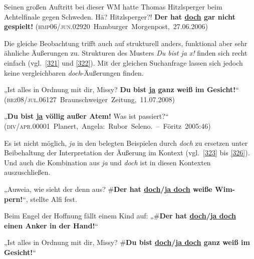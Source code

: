 \begin{exe}
	\ex\label{320}
 
	Seinen großen Auftritt bei dieser WM hatte Thomas Hitzlsperger beim Achtelfinale gegen Schweden. Hä? Hitzlsperger?! \textbf{Der hat \underline{doch} 		gar nicht gespielt!}     
	\hbox{}\hfill\hbox{(\textsc{hmp06/jun.02920} Hamburger Morgenpost, 27.06.2006)}	
\end{exe}						   
Die gleiche Beobachtung trifft auch auf strukturell anders, funktional aber sehr ähnliche Äußerungen zu. Strukturen des Musters \textit{Du bist ja x!} finden sich recht einfach (vgl.\ \ref{321} und \ref{322}). Mit der gleichen Suchanfrage lassen sich jedoch keine vergleichbaren \textit{doch}-Äußerungen finden.

\begin{exe}
	\ex\label{321}
 
	 „Ist alles in Ordnung mit dir, Missy? \textbf{Du bist \underline{ja} ganz weiß im Gesicht!}“    
	\newline
	\hbox{}\hfill\hbox{(\textsc{brz08/jul.06127} Braunschweiger Zeitung, 11.07.2008)}	
\end{exe}

\begin{exe}
	\ex\label{322}
 
	 „\textbf{Du bist \underline{ja} völlig außer Atem!} Was ist passiert?“    
	\newline
	\hbox{}\hfill\hbox{(\textsc{div/apr.00001} Planert, Angela: Rubor Seleno. – Föritz 2005:46)}
\end{exe}	 
Es ist nicht möglich, \textit{ja} in den belegten Beispielen durch \textit{doch} zu ersetzen unter Beibehaltung der Interpretation der Äußerung im Kontext (vgl.\ \ref{323} bis \ref{326}). Und auch die Kombination aus \textit{ja} und \textit{doch} ist in diesen Kontexten auszuschließen.

\begin{exe}
	\ex\label{323}
	„Auweia, wie sieht der denn aus? \#\textbf{Der hat \underline{\vphantom{j}doch}/\underline{ja doch} weiße Wim-\linebreak pern!}“, stellte Alfi fest.
\end{exe}	

\begin{exe}
	\ex\label{324}
	Beim Engel der Hoffnung fällt einem Kind auf: „\#\textbf{Der hat \underline{\vphantom{j}doch}/\underline{ja doch} einen Anker in der Hand!}“
\end{exe}	

\begin{exe}
	\ex\label{325}
	„Ist alles in Ordnung mit dir, Missy? \#\textbf{Du bist \underline{\vphantom{j}doch}/\underline{ja doch} ganz weiß im Gesicht!}“
\end{exe}

